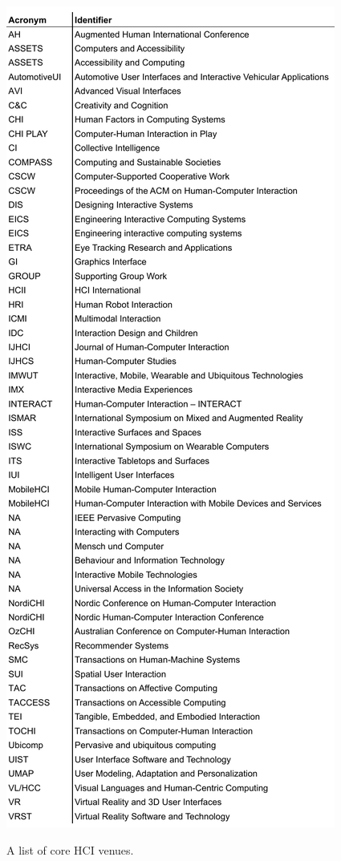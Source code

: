 \begin{table}
    \includegraphics[width=\columnwidth]{figures/hci_venues.pdf}
    \caption{A list of core HCI venues.}
    \label{tb:venues}
\end{table}

